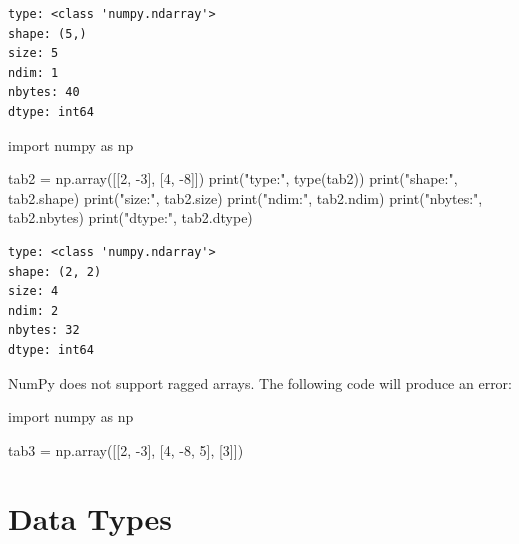 \documentclass[
  english,
  letterpaper,
  DIV=11,
  numbers=noendperiod]{scrreprt}
\newenvironment{Shaded}{\begin{snugshade}}{\end{snugshade}}
\newcommand{\BuiltInTok}[1]{\textcolor[rgb]{0.00,0.23,0.31}{#1}}
\newcommand{\DecValTok}[1]{\textcolor[rgb]{0.68,0.00,0.00}{#1}}
\newcommand{\ImportTok}[1]{\textcolor[rgb]{0.00,0.46,0.62}{#1}}
\newcommand{\NormalTok}[1]{\textcolor[rgb]{0.00,0.23,0.31}{#1}}
\newcommand{\OperatorTok}[1]{\textcolor[rgb]{0.37,0.37,0.37}{#1}}
\newcommand{\StringTok}[1]{\textcolor[rgb]{0.13,0.47,0.30}{#1}}
\begin{document}
\begin{verbatim}
type: <class 'numpy.ndarray'>
shape: (5,)
size: 5
ndim: 1
nbytes: 40
dtype: int64
\end{verbatim}

\begin{Shaded}
\begin{Highlighting}[]
\ImportTok{import}\NormalTok{ numpy }\ImportTok{as}\NormalTok{ np}

\NormalTok{tab2 }\OperatorTok{=}\NormalTok{ np.array([[}\DecValTok{2}\NormalTok{, }\OperatorTok{{-}}\DecValTok{3}\NormalTok{], [}\DecValTok{4}\NormalTok{, }\OperatorTok{{-}}\DecValTok{8}\NormalTok{]])}
\BuiltInTok{print}\NormalTok{(}\StringTok{"type:"}\NormalTok{, }\BuiltInTok{type}\NormalTok{(tab2))}
\BuiltInTok{print}\NormalTok{(}\StringTok{"shape:"}\NormalTok{, tab2.shape)}
\BuiltInTok{print}\NormalTok{(}\StringTok{"size:"}\NormalTok{, tab2.size)}
\BuiltInTok{print}\NormalTok{(}\StringTok{"ndim:"}\NormalTok{, tab2.ndim)}
\BuiltInTok{print}\NormalTok{(}\StringTok{"nbytes:"}\NormalTok{, tab2.nbytes)}
\BuiltInTok{print}\NormalTok{(}\StringTok{"dtype:"}\NormalTok{, tab2.dtype)}
\end{Highlighting}
\end{Shaded}

\begin{verbatim}
type: <class 'numpy.ndarray'>
shape: (2, 2)
size: 4
ndim: 2
nbytes: 32
dtype: int64
\end{verbatim}

NumPy does not support ragged arrays. The following code will produce an
error:

\begin{Shaded}
\begin{Highlighting}[]
\ImportTok{import}\NormalTok{ numpy }\ImportTok{as}\NormalTok{ np}

\NormalTok{tab3 }\OperatorTok{=}\NormalTok{ np.array([[}\DecValTok{2}\NormalTok{, }\OperatorTok{{-}}\DecValTok{3}\NormalTok{], [}\DecValTok{4}\NormalTok{, }\OperatorTok{{-}}\DecValTok{8}\NormalTok{, }\DecValTok{5}\NormalTok{], [}\DecValTok{3}\NormalTok{]])}
\end{Highlighting}
\end{Shaded}

\chapter{Data Types}\label{data-types}
\end{document}
